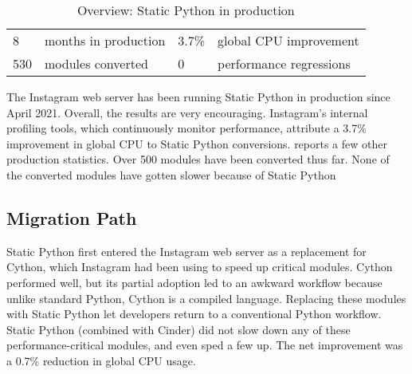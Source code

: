 \documentclass[english,cleveref,submission]{programming}
\newcommand{\SP}{Static Python}
\begin{document}



\begin{table}
  \caption{Overview: \SP{} in production}
  \label{t:prod-stat}
  \begin{tabular}{l@{~~}ll@{~~}l}
    8     & months in production & 3.7\% & global CPU improvement \\
    530   & modules converted  &  0 & performance regressions
  \end{tabular}
\end{table}

The Instagram web server has been running \SP{} in production since April 2021.
Overall, the results are very encouraging.
Instagram's internal profiling tools, which continuously monitor
performance, attribute a 3.7\% improvement in global CPU to \SP{} conversions.
 reports a few other production statistics.
Over 500 modules have been converted thus far.
None of the converted modules have gotten slower because of \SP{}


\subsection{Migration Path}

\SP{} first entered the Instagram web server as a replacement for Cython,
which Instagram had been using to speed up critical modules.
Cython performed well, but its partial adoption led to an awkward workflow
because unlike standard Python, Cython is a compiled language.
Replacing these modules with \SP{} let developers return to a conventional
Python workflow.
\SP{} (combined with Cinder) did not slow down any of these
performance-critical modules, and even sped a few up.
The net improvement was a 0.7\% reduction in global CPU usage.
\end{document}
